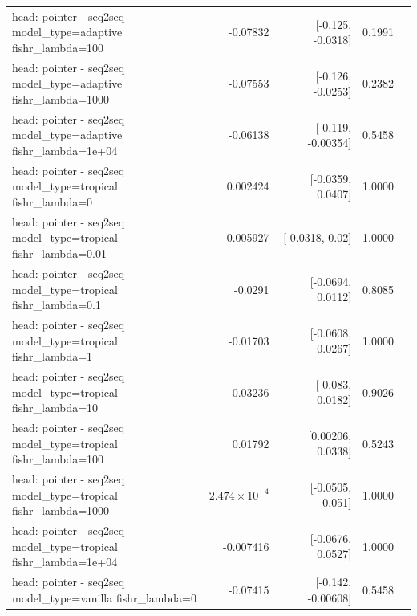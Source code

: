 \documentclass[10pt]{article}
\makeatletter
\newcommand{\stackcell}[1]{\begin{tabular}[t]{@{}l@{}}#1\end{tabular}}
\makeatother
\begin{document}
{\begin{longtable}{lrrrl}
\stackcell{head: pointer - seq2seq\\\footnotesize model\_type=adaptive fishr\_lambda=100 } & -0.07832 & [-0.125, -0.0318] & 0.1991 & \\
\stackcell{head: pointer - seq2seq\\\footnotesize model\_type=adaptive fishr\_lambda=1000 } & -0.07553 & [-0.126, -0.0253] & 0.2382 & \\
\stackcell{head: pointer - seq2seq\\\footnotesize model\_type=adaptive fishr\_lambda=1e+04 } & -0.06138 & [-0.119, -0.00354] & 0.5458 & \\
\stackcell{head: pointer - seq2seq\\\footnotesize model\_type=tropical fishr\_lambda=0 } & 0.002424 & [-0.0359, 0.0407] & 1.0000 & \\
\stackcell{head: pointer - seq2seq\\\footnotesize model\_type=tropical fishr\_lambda=0.01 } & -0.005927 & [-0.0318, 0.02] & 1.0000 & \\
\stackcell{head: pointer - seq2seq\\\footnotesize model\_type=tropical fishr\_lambda=0.1 } & -0.0291 & [-0.0694, 0.0112] & 0.8085 & \\
\stackcell{head: pointer - seq2seq\\\footnotesize model\_type=tropical fishr\_lambda=1 } & -0.01703 & [-0.0608, 0.0267] & 1.0000 & \\
\stackcell{head: pointer - seq2seq\\\footnotesize model\_type=tropical fishr\_lambda=10 } & -0.03236 & [-0.083, 0.0182] & 0.9026 & \\
\stackcell{head: pointer - seq2seq\\\footnotesize model\_type=tropical fishr\_lambda=100 } & 0.01792 & [0.00206, 0.0338] & 0.5243 & \\
\stackcell{head: pointer - seq2seq\\\footnotesize model\_type=tropical fishr\_lambda=1000 } & $2.474\times10^{-4}$ & [-0.0505, 0.051] & 1.0000 & \\
\stackcell{head: pointer - seq2seq\\\footnotesize model\_type=tropical fishr\_lambda=1e+04 } & -0.007416 & [-0.0676, 0.0527] & 1.0000 & \\
\stackcell{head: pointer - seq2seq\\\footnotesize model\_type=vanilla fishr\_lambda=0 } & -0.07415 & [-0.142, -0.00608] & 0.5458 & \\

\end{longtable}}
\end{document}
